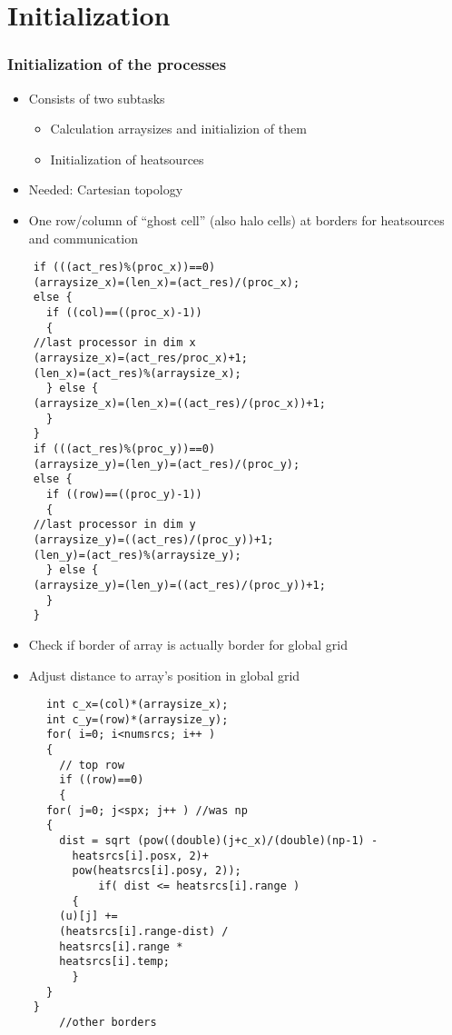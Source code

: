 \section{Initialization}
\begin{frame}
  \frametitle{Initialization of the processes}
  \begin{itemize}
  \item Consists of two subtasks
    \begin{itemize}
    \item Calculation arraysizes and initializion of them
    \item Initialization of heatsources
    \end{itemize}
    \item Needed: Cartesian topology
    \item One row/column of ``ghost cell'' (also halo cells) at borders for heatsources and communication
  \end{itemize}
\end{frame}


\begin{frame}[fragile]
  \begin{lstlisting}
    if (((act_res)%(proc_x))==0)
    (arraysize_x)=(len_x)=(act_res)/(proc_x);
    else {
      if ((col)==((proc_x)-1))
      {
	//last processor in dim x
	(arraysize_x)=(act_res/proc_x)+1;
	(len_x)=(act_res)%(arraysize_x);
      } else {
	(arraysize_x)=(len_x)=((act_res)/(proc_x))+1; 
      }
    }    
    if (((act_res)%(proc_y))==0)
    (arraysize_y)=(len_y)=(act_res)/(proc_y);
    else {
      if ((row)==((proc_y)-1))
      {
	//last processor in dim y
	(arraysize_y)=((act_res)/(proc_y))+1;
	(len_y)=(act_res)%(arraysize_y);
      } else {
	(arraysize_y)=(len_y)=((act_res)/(proc_y))+1; 
      }
    }
  \end{lstlisting}


\end{frame}



\begin{frame}
  \begin{itemize}
  \item Check if border of array is actually border for global grid
    \item Adjust distance to array's position in global grid
  \end{itemize}
\end{frame}




\begin{frame}[fragile]
  \begin{lstlisting}
      int c_x=(col)*(arraysize_x);
      int c_y=(row)*(arraysize_y);
      for( i=0; i<numsrcs; i++ )
      {
        // top row 
        if ((row)==0)
        {
	  for( j=0; j<spx; j++ ) //was np
	  { 
	    dist = sqrt (pow((double)(j+c_x)/(double)(np-1) -
	      heatsrcs[i].posx, 2)+
	      pow(heatsrcs[i].posy, 2));
              if( dist <= heatsrcs[i].range )
	      {
		(u)[j] += 
		(heatsrcs[i].range-dist) /
		heatsrcs[i].range *
		heatsrcs[i].temp;
	      }
	  }
	}
        //other borders
  \end{lstlisting}
\end{frame}

